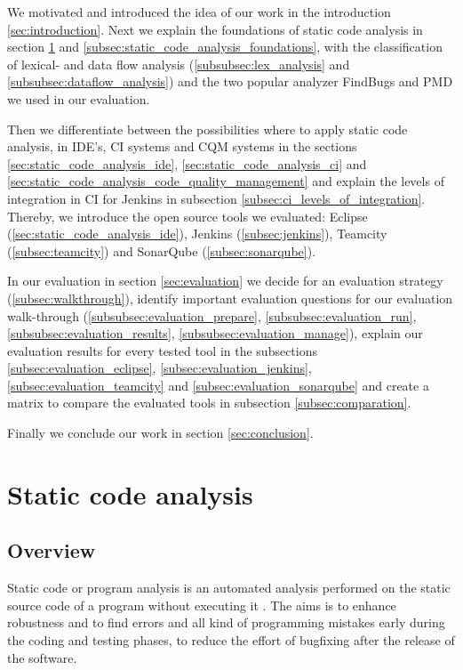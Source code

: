 \documentclass[conference]{IEEEtran}
\begin{document}
We motivated and introduced the idea of our work in the introduction \ref{sec:introduction}.
Next we explain the foundations of static code analysis in section \ref{sec:static_code_analysis} and \ref{subsec:static_code_analysis_foundations}, with the classification of lexical- and data flow analysis (\ref{subsubsec:lex_analysis} and \ref{subsubsec:dataflow_analysis}) and the two popular analyzer FindBugs and PMD we used in our evaluation.

Then we differentiate between the possibilities where to apply static code analysis, in IDE's, CI systems and CQM systems in the sections \ref{sec:static_code_analysis_ide}, \ref{sec:static_code_analysis_ci} and \ref{sec:static_code_analysis_code_quality_management} and explain the levels of integration in CI for Jenkins in subsection \ref{subsec:ci_levels_of_integration}.
Thereby, we introduce the open source tools we evaluated: Eclipse (\ref{sec:static_code_analysis_ide}), Jenkins (\ref{subsec:jenkins}), Teamcity (\ref{subsec:teamcity}) and SonarQube (\ref{subsec:sonarqube}).

In our evaluation in section \ref{sec:evaluation} we decide for an evaluation strategy (\ref{subsec:walkthrough}), identify important evaluation questions for our evaluation walk-through (\ref{subsubsec:evaluation_prepare}, \ref{subsubsec:evaluation_run}, \ref{subsubsec:evaluation_results}, \ref{subsubsec:evaluation_manage}), explain our evaluation results for every tested tool in the subsections \ref{subsec:evaluation_eclipse}, \ref{subsec:evaluation_jenkins}, \ref{subsec:evaluation_teamcity} and \ref{subsec:evaluation_sonarqube} and create a matrix to compare the evaluated tools in subsection \ref{subsec:comparation}.


Finally we conclude our work in section \ref{sec:conclusion}.

\section{Static code analysis}
\label{sec:static_code_analysis}
\subsection{Overview}
\label{subsec:static_code_analysis_overview}
Static code or program analysis is an automated analysis performed on the static source code of a program without executing it \cite{Static_Code_Analysis_def}.
The aims is to enhance robustness and to find errors and all kind of programming mistakes early during the coding and testing phases, to reduce the effort of bugfixing after the release of the software.
\end{document}
